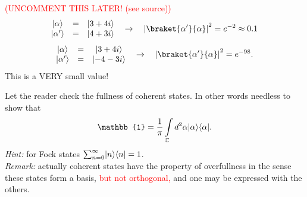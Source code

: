 	\textcolor{red}{(UNCOMMENT THIS LATER! (see source))}
	\begin{equation}
	\begin{matrix}
	\ket{\alpha} &=& \ket{3+4i} \\
	\ket{\alpha'} &=& \ket{4+3i} \\
	\end{matrix}
	\quad \to \quad \left|\braket{\alpha'}{\alpha}\right|^2 = e^{-2} \approx 0.1
	\end{equation}
	\begin{equation}
	\begin{matrix}
	\ket{\alpha} &=& \ket{3+4i} \\
	\ket{\alpha'} &=& \ket{-4-3i} \\
	\end{matrix}
	\quad \to \quad \left|\braket{\alpha'}{\alpha}\right|^2  = e^{-98}.
	\end{equation}
	This is a VERY small value!

Let the reader check the fullness of coherent states. In other words needless to show that
\begin{equation}
	\mathbb{1} = \frac{1}{\pi} \int \limits_{\mathbb{C}} d^2 \alpha \ket{\alpha} \bra{\alpha}.
\end{equation}
\textit{Hint:} for Fock states $\sum_{n=0}^{\infty} \lvert n\rangle \langle n\rvert = 1$.\\
\textit{Remark:} actually coherent states have the property of overfullness in the sense these states form a basis,  {\textcolor{red}{ but not orthogonal,  }} and one may be expressed with the others.

